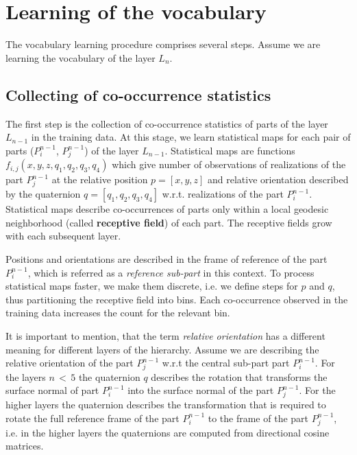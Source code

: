 \documentclass[runningheads]{llncs}
\begin{document}
\section{Learning of the vocabulary\label{sec:Learning}}

The vocabulary learning procedure comprises several steps. Assume we
are learning the vocabulary of the layer $L_n$.

\subsection{Collecting of co-occurrence statistics\label{sec:Collection}}
    The first step is the collection of co-occurrence statistics of parts of the layer $L_{n-1}$ in the training data. At
    this stage, we learn statistical maps for each pair of parts ($P_i^{n-1}$, $P_j^{n-1}$) of the layer
    $L_{n-1}$. Statistical maps are functions $f_{i,j}(x,y,z,q_1,q_2,q_3,q_4)$ which give number of observations of realizations of the part
    $P_j^{n-1}$ at the relative position $p = [x,y,z]$ and relative orientation described
    by the quaternion $q = [q_1,q_2,q_3,q_4]$ w.r.t. realizations of the part
    $P_i^{n-1}$. Statistical maps describe co-occurrences of parts only within a local geodesic neighborhood (called \textbf{receptive
    field}) of each part. The receptive fields grow with each subsequent
    layer.

    Positions and orientations are described in the frame of reference
    of the part $P_i^{n-1}$, which is referred as a \emph{reference sub-part}
    in this context. To process statistical maps faster, we make them discrete, i.e. we define steps
    for $p$ and $q$, thus partitioning the receptive field into
    bins. Each co-occurrence observed in the training
    data increases the count for the relevant bin.

    It is important to mention, that the term \emph{relative orientation}
    has a different meaning for different layers of the hierarchy. Assume
    we are describing the relative orientation of the part $P_j^{n-1}$ w.r.t the central sub-part
    part $P_i^{n-1}$. For the layers $n\,{<}\,5$ the quaternion $q$ describes
    the rotation that transforms the surface normal of part $P_i^{n-1}$ into the surface normal
    of the part $P_j^{n-1}$. For the higher layers the quaternion
    describes the
    transformation that is required to rotate the full reference frame of the part $P_i^{n-1}$ to the
    frame of the part $P_j^{n-1}$, i.e. in the higher layers the quaternions are computed from
    directional cosine matrices.
\end{document}
